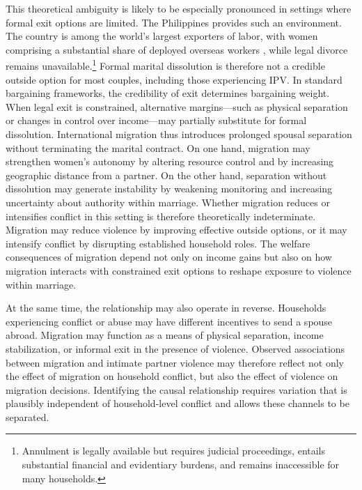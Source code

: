 \documentclass[12pt]{article}
\begin{document}
This theoretical ambiguity is likely to be especially pronounced in settings where formal exit options are limited. The Philippines provides such an environment. The country is among the world’s largest exporters of labor, with women comprising a substantial share of deployed overseas workers \citep{mcauliffe2024world}, while legal divorce remains unavailable.\footnote{Annulment is legally available but requires judicial proceedings, entails substantial financial and evidentiary burdens, and remains inaccessible for many households.} Formal marital dissolution is therefore not a credible outside option for most couples, including those experiencing IPV. In standard bargaining frameworks, the credibility of exit determines bargaining weight. When legal exit is constrained, alternative margins—such as physical separation or changes in control over income—may partially substitute for formal dissolution. International migration thus introduces prolonged spousal separation without terminating the marital contract. On one hand, migration may strengthen women’s autonomy by altering resource control and by increasing geographic distance from a partner. On the other hand, separation without dissolution may generate instability by weakening monitoring and increasing uncertainty about authority within marriage. Whether migration reduces or intensifies conflict in this setting is therefore theoretically indeterminate. Migration may reduce violence by improving effective outside options, or it may intensify conflict by disrupting established household roles. The welfare consequences of migration depend not only on income gains but also on how migration interacts with constrained exit options to reshape exposure to violence within marriage.

At the same time, the relationship may also operate in reverse. Households experiencing conflict or abuse may have different incentives to send a spouse abroad. Migration may function as a means of physical separation, income stabilization, or informal exit in the presence of violence. Observed associations between migration and intimate partner violence may therefore reflect not only the effect of migration on household conflict, but also the effect of violence on migration decisions. Identifying the causal relationship requires variation that is plausibly independent of household-level conflict and allows these channels to be separated.
\end{document}
